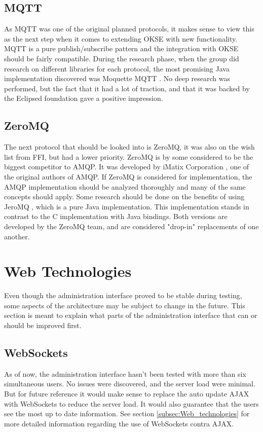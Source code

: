 \subsection{MQTT}
As MQTT was one of the original planned protocols, it makes sense to view this as the next step when it comes to extending OKSE with new functionality. MQTT is a pure publish/subscribe pattern and the integration with OKSE should be fairly compatible. 
During the research phase, when the group did research on different libraries for each protocol, the most promising Java implementation discovered was Moquette MQTT \cite{moquette-mqtt}. No deep research was performed, but the fact that it had a lot of traction, and that it was backed by the Eclipsed foundation gave a positive impression.

\subsection{ZeroMQ}
The next protocol that should be looked into is ZeroMQ, it was also on the wish list from FFI, but had a lower priority. ZeroMQ is by some considered to be the biggest competitor to AMQP. It was developed by iMatix Corporation \cite{imatix}, one of the original authors of AMQP. If ZeroMQ is considered for implementation, the AMQP implementation should be analyzed thoroughly and many of the same concepts should apply. Some research should be done on the benefits of using JeroMQ \cite{jero-mq}, which is a pure Java implementation. This implementation stands in contrast to the C implementation with Java bindings. Both versions are developed by the ZeroMQ team, and are considered "drop-in" replacements of one another.

\section{Web Technologies}
Even though the administration interface proved to be stable during testing, some aspects of the architecture may be subject to change in the future. This section is meant to explain what parts of the administration interface that can or should be improved first. 

\subsection{WebSockets}
As of now, the administration interface hasn't been tested with more than six simultaneous users. No issues were discovered, and the server load were minimal. But for future reference it would make sense to replace the auto update AJAX with WebSockets to reduce the server load. It would also guarantee that the users see the most up to date information. See section \ref{subsec:Web_technologies} for more detailed information regarding the use of WebSockets contra AJAX.

\clearpage
